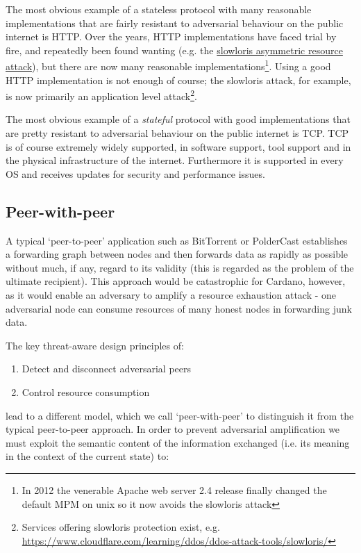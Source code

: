 \documentclass[11pt,a4paper]{article}
\begin{document}
The most obvious example of a stateless protocol with many reasonable
implementations that are fairly resistant to adversarial behaviour on
the public internet is HTTP. Over the years, HTTP implementations have
faced trial by fire, and repeatedly been found wanting (e.g. the
\href{https://en.wikipedia.org/wiki/Slowloris_(computer_security)}{{slowloris
asymmetric resource attack}}), but there are now many reasonable
implementations\footnote{In 2012 the venerable Apache web server 2.4
  release finally changed the default MPM on unix so it now avoids the
  slowloris attack}. Using a good HTTP implementation is not enough of
course; the slowloris attack, for example, is now primarily an
application level attack\footnote{Services offering slowloris protection
  exist, e.g.
  \href{https://www.cloudflare.com/learning/ddos/ddos-attack-tools/slowloris/}{{https://www.cloudflare.com/learning/ddos/ddos-attack-tools/slowloris/}}}.

The most obvious example of a \emph{stateful} protocol with good
implementations that are pretty resistant to adversarial behaviour on
the public internet is TCP. TCP is of course extremely widely supported,
in software support, tool support and in the physical infrastructure of
the internet. Furthermore it is supported in every OS and receives
updates for security and performance issues.

\subsection{Peer-with-peer}
\label{peer-with-peer}

A typical `peer-to-peer' application such as BitTorrent or PolderCast
establishes a forwarding graph between nodes and then forwards data as
rapidly as possible without much, if any, regard to its validity (this
is regarded as the problem of the ultimate recipient). This approach
would be catastrophic for Cardano, however, as it would enable an
adversary to amplify a resource exhaustion attack - one adversarial node
can consume resources of many honest nodes in forwarding junk data.

The key threat-aware design principles of:

\begin{enumerate}
\item
  Detect and disconnect adversarial peers
\item
  Control resource consumption
\end{enumerate}

lead to a different model, which we call `peer-with-peer' to distinguish
it from the typical peer-to-peer approach. In order to prevent
adversarial amplification we must exploit the semantic content of the
information exchanged (i.e. its meaning in the context of the current
state) to:
\end{document}
